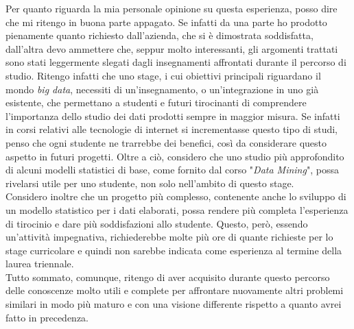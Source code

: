 \noindent Per quanto riguarda la mia personale opinione su questa esperienza, posso dire che mi ritengo in buona parte appagato. Se infatti da una parte ho prodotto pienamente quanto richiesto dall'azienda, che si è dimostrata soddisfatta, dall'altra devo ammettere che, seppur molto interessanti, gli argomenti trattati sono stati leggermente slegati dagli insegnamenti affrontati durante il percorso di studio. 
Ritengo infatti che uno stage, i cui obiettivi principali riguardano il mondo \textit{big data}, necessiti di un'insegnamento, o un'integrazione in uno già esistente, che permettano a studenti e futuri tirocinanti di comprendere l'importanza dello studio dei dati prodotti sempre in maggior misura. Se infatti in corsi relativi alle tecnologie di internet si incrementasse questo tipo di studi, penso che ogni studente ne trarrebbe dei benefici, così da considerare questo aspetto in futuri progetti.
Oltre a ciò, considero che uno studio più approfondito di alcuni modelli statistici di base, come fornito dal corso "\textit{Data Mining}", possa rivelarsi utile per uno studente, non solo nell'ambito di questo stage. \\
Considero inoltre che un progetto più complesso, contenente anche lo sviluppo di un modello statistico per i dati elaborati, possa rendere più completa l'esperienza di tirocinio e dare più soddisfazioni allo studente. Questo, però, essendo un'attività impegnativa, richiederebbe molte più ore di quante richieste per lo stage curricolare e quindi non sarebbe indicata come esperienza al termine della laurea triennale. \\
Tutto sommato, comunque, ritengo di aver acquisito durante questo percorso delle conoscenze molto utili e complete per affrontare nuovamente altri problemi similari in modo più maturo e con una visione differente rispetto a quanto avrei fatto in precedenza.